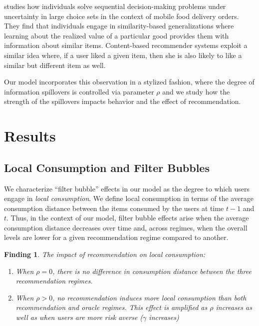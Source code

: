 \documentclass[format=acmsmall, review=false]{acmart}
\newtheorem{finding}{Finding}
\begin{document}
\cite{schulz2019structured} studies how individuals solve sequential decision-making problems under uncertainty in large choice sets in the context of mobile food delivery orders. They find that individuals engage in similarity-based generalizations where learning about the realized value of a particular good provides them with information about similar items. Content-based recommender systems exploit a similar idea where, if a user liked a given item, then she is also likely to like a similar but different item as well.
\par

Our model incorporates this observation in a stylized fashion, where the degree of information spillovers is controlled via parameter $\rho$ and we study how the strength of the spillovers impacts behavior and the effect of recommendation.
\par

\section{Results}
\subsection{Local Consumption and Filter Bubbles}
We characterize ``filter bubble'' effects in our model as the degree to which users engage in \textit{local consumption}. We define local consumption in terms of the average consumption distance between the items consumed by the users at time $t-1$ and $t$. Thus, in the context of our model, filter bubble effects arise when the average consumption distance decreases over time and, across regimes, when the overall levels are lower for a given recommendation regime compared to another.


\begin{finding}\label{finding_local_consumption}
The impact of recommendation on local consumption:
\begin{enumerate}
\item When $\rho = 0$, there is no difference in consumption distance between the three recommendation regimes.
\item When $\rho > 0$, no recommendation induces more local consumption than both recommendation and oracle regimes. This effect is amplified as $\rho$ increases as well as when users are more risk averse ($\gamma$ increases)
\end{enumerate}
\end{finding}
\end{document}
